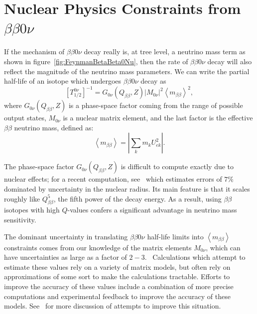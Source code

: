 \section{Nuclear Physics Constraints from \texorpdfstring{$\beta\beta 0\nu$}{Neutrinoless Double-Beta}}

If the mechanism of $\beta\beta 0\nu$ decay really is, at tree level, a neutrino mass term as shown in figure~\ref{fig:FeynmanBetaBeta0Nu}, then the rate of $\beta\beta 0\nu$ decay will also reflect the magnitude of the neutrino mass parameters.  We can write the partial half-life of an isotope which undergoes $\beta\beta 0\nu$ decay as
\begin{equation}
\left[T^{0\nu}_{1/2}\right]^{-1} = G_{0\nu}(Q_{\beta\beta}, Z) \left| M_{0\nu}\right|^2 \left< m_{\beta\beta} \right>^2,
\end{equation}
where $G_{0\nu}(Q_{\beta\beta}, Z)$ is a phase-space factor coming from the range of possible output states, $M_{0\nu}$ is a nuclear matrix element, and the last factor is the effective $\beta\beta$ neutrino mass, defined as:
\begin{equation} \label{eq:DestructiveMassInteraction}
\left< m_{\beta\beta} \right> = \left|\sum_k m_k U_{ek}^2\right|.
\end{equation}

The phase-space factor $G_{0\nu}(Q_{\beta\beta}, Z)$ is difficult to compute exactly due to nuclear effects; for a recent computation, see~\cite{PhysRevC.85.034316} which estimates errors of $7\%$ dominated by uncertainty in the nuclear radius.  Its main feature is that it scales roughly like $Q_{\beta\beta}^5$, the fifth power of the decay energy.  As a result, using $\beta\beta$ isotopes with high $Q$-values confers a significant advantage in neutrino mass sensitivity.

The dominant uncertainty in translating $\beta\beta 0\nu$ half-life limits into $\left< m_{\beta\beta} \right>$ constraints comes from our knowledge of the matrix elements $M_{0\nu}$, which can have uncertainties as large as a factor of $2-3$.~\cite{RMPbb0n}  Calculations which attempt to estimate these values rely on a variety of matrix models, but often rely on approximations of some sort to make the calculations tractable.  Efforts to improve the accuracy of these values include a combination of more precise computations and experimental feedback to improve the accuracy of these models.  See~\cite{ZuberWorkshop} for more discussion of attempts to improve this situation.

